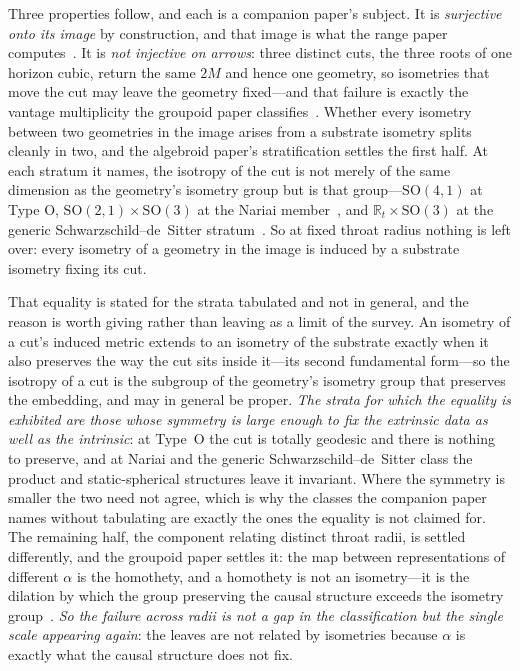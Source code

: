 \documentclass[11pt,a4paper]{article}
\theoremstyle{definition}
\begin{document}
Three properties follow, and each is a
companion paper's subject. It is \emph{surjective onto its image} by construction, and that image is what the
range paper computes~\cite{JanzenRange}. It is \emph{not injective on arrows}: three distinct cuts, the three
roots of one horizon cubic, return the same $2M$ and hence one geometry, so isometries that move the cut may
leave the geometry fixed---and that failure is exactly the vantage multiplicity the groupoid paper
classifies~\cite{JanzenGroupoid}. Whether every isometry between two geometries in the image arises from a
substrate isometry splits cleanly in two, and the algebroid paper's stratification settles the first half. At
each stratum it names, the isotropy of the cut is not merely of the same dimension as the geometry's isometry
group but is that group---$\mathrm{SO}(4,1)$ at Type O, $\mathrm{SO}(2,1)\times\mathrm{SO}(3)$ at the Nariai member~\cite{Nariai1951}, and
$\mathbb{R}_{t}\times\mathrm{SO}(3)$ at the generic Schwarzschild--de~Sitter
stratum~\cite{JanzenAlgebroid}. So at fixed throat radius nothing is left over: every isometry
of a geometry in the image is induced by a substrate isometry fixing its cut. 

That equality is stated for the strata tabulated and not in general, and the reason is worth
giving rather than leaving as a limit of the survey. An isometry of a cut's induced metric extends to an
isometry of the substrate exactly when it also preserves the way the cut sits inside it---its second
fundamental form---so the isotropy of a cut is the subgroup of the geometry's isometry group that preserves the
embedding, and may in general be proper. \emph{The strata for which the
equality is exhibited are those whose symmetry is large enough to fix the extrinsic data as well as the
intrinsic}: at Type~O the cut is totally geodesic and there is nothing to preserve, and at Nariai and the
generic Schwarzschild--de~Sitter class the product and static-spherical structures leave it invariant. Where
the symmetry is smaller the two need not agree, which is why the classes the companion paper names without
tabulating are exactly the ones the equality is not claimed for. The remaining half, the component relating distinct throat radii, is settled differently, and
the groupoid paper settles it:
the map between representations of different $\alpha$ is the homothety, and a homothety is not an isometry---it
is the dilation by which the group preserving the causal structure exceeds the isometry
group~\cite{JanzenGroupoid}. \emph{So the failure across radii is not a gap in the classification but the
single scale appearing again}: the leaves are not related by isometries because $\alpha$ is exactly what the
causal structure does not fix.
\end{document}
